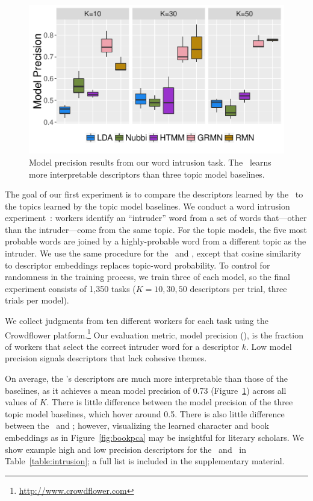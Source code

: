 \begin{figure}[t!]
\includegraphics[width=1.0\linewidth]{2016_naacl_relationships/figures/topic_intrusion.pdf}
  \caption{Model precision results from our word intrusion task. The \rmn\
  learns more interpretable descriptors than three topic model baselines.}
\label{fig:intrusion}
\end{figure}

The goal of our first experiment is to compare the descriptors
 learned by the \rmn\ to the topics learned by the topic model
baselines. We conduct a word intrusion
experiment~\cite{chang2009reading}: workers identify an ``intruder''
word from a set of words that---other than the intruder---come from
the same topic. For the topic models, the five most probable words are
joined by a highly-probable word from a different topic as the
intruder. We use the same procedure for the \rmn\ and \grmn, except that
cosine similarity to descriptor embeddings replaces topic-word
probability. To control for randomness in the training process, we
train three of each model, so the final experiment consists of 1,350
tasks ($K=10,30,50$ descriptors per trial, three trials per model).

We collect judgments from ten different workers for each task using the
Crowdflower platform.\footnote{\url{http://www.crowdflower.com}} Our evaluation
metric, model precision (\abr{mp}), is the fraction of workers that select the
correct intruder word for a descriptor $k$.  Low model precision signals
descriptors that lack cohesive themes.

On average, the \rmn's descriptors are much more interpretable than those of the
baselines, as it achieves a mean model precision of 0.73
(Figure~\ref{fig:intrusion}) across all values of $K$.  There is little
difference between the model precision of the three topic model baselines,
which hover around 0.5. There is also little difference between the \grmn\ and
\rmn; however, visualizing the learned character and book embeddings as in
Figure~\ref{fig:bookpca} may be insightful for literary scholars. We show
example high and low precision descriptors for the \rmn\ and \htmm\ in
Table~\ref{table:intrusion}; a full list is included in the supplementary
material.

